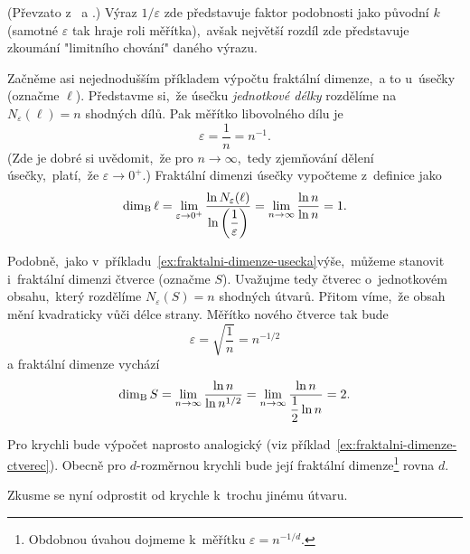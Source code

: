 (Převzato z~\cite[str. 93]{Zelinka2006} a \cite[str. 28]{Falconer2014}.) Výraz $1/\varepsilon$ zde představuje faktor podobnosti jako původní $k$ (samotné $\varepsilon$ tak hraje roli měřítka),~avšak největší rozdíl zde představuje zkoumání "limitního chování" daného výrazu.
\begin{example}\label{ex:fraktalni-dimenze-usecka}
    Začněme asi nejednodušším příkladem výpočtu fraktální dimenze,~a to u~úsečky (označme $\ell$). Představme si,~že úsečku \emph{jednotkové délky} rozdělíme na $N_\varepsilon(\ell)=n$ shodných dílů. Pak měřítko libovolného dílu je
    \[\varepsilon=\dfrac{1}{n}=n^{-1}.\]
    (Zde je dobré si uvědomit,~že pro $n\to\infty$,~tedy zjemňování dělení úsečky,~platí,~že $\varepsilon\to 0^+$.) Fraktální dimenzi úsečky vypočteme z~definice jako
    \[\operatorname{dim_B}{\ell}=\lim_{\varepsilon\to 0^+}{\dfrac{\ln{N_\varepsilon(\ell)}}{\ln{\left(\dfrac{1}{\varepsilon}\right)}}}=\lim_{n\to\infty}{\dfrac{\ln{n}}{\ln{n}}}=1.\]
\end{example}
\begin{example}\label{ex:fraktalni-dimenze-ctverec}
    Podobně,~jako v~příkladu~\ref{ex:fraktalni-dimenze-usecka}\linebreak{}výše,~můžeme stanovit i~fraktální dimenzi čtverce (označme $S$). Uvažujme tedy čtverec o~jednotkovém obsahu,~který rozdělíme $N_\varepsilon(S)=n$ shodných útvarů. Přitom víme,~že obsah mění kvadraticky vůči délce strany. Měřítko nového čtverce tak bude
    \[\varepsilon=\sqrt{\dfrac{1}{n}}=n^{-1/2}\]
    a fraktální dimenze vychází
    \[\operatorname{dim_B}{S}=\lim_{n\to\infty}{\dfrac{\ln{n}}{\ln{n^{1/2}}}}=\lim_{n\to\infty}{\dfrac{\ln{n}}{\dfrac{1}{2}\ln{n}}}=2.\]
\end{example}
Pro krychli bude výpočet naprosto analogický (viz příklad~\ref{ex:fraktalni-dimenze-ctverec}). Obecně pro $d$-rozměrnou krychli bude její fraktální dimenze\footnote{Obdobnou úvahou dojmeme k~měřítku $\varepsilon=n^{-1/d}$.} rovna $d$.\par
Zkusme se nyní odprostit od krychle k~trochu jinému útvaru.
